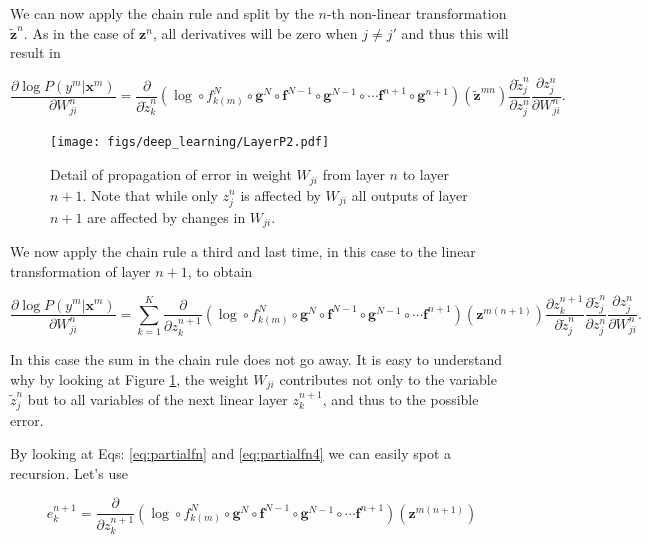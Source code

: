 We can now apply the chain rule and split by the $n$-th non-linear
transformation $\tilde{\mathbf{z}}^n$. As in the case of $\mathbf{z}^n$, all
derivatives will be zero when $j\neq j'$ and thus this will result in

\begin{equation}
\frac{\partial \log P(y^m | \mathbf{x}^m)}{\partial W_{ji}^n} = \frac{\partial}{\partial \tilde{z}^{n}_{k}} (\log \circ f_{k(m)}^N \circ \mathbf{g}^N \circ \mathbf{f}^{N-1} \circ \mathbf{g}^{N-1} \circ \cdots \mathbf{f}^{n+1} \circ \mathbf{g}^{n+1})(\tilde{\mathbf{z}}^{mn})\frac{\partial \tilde{z}^n_{j}}{\partial z_{j}^n}\frac{\partial z^n_{j}}{\partial W_{ji}^n} .
\label{eq:partialfn3}
\end{equation}


\begin{figure}
\centering
\texttt{[image: figs/deep\_learning/LayerP2.pdf]}
\caption{Detail of propagation of error in weight $W_{ji}$ from layer $n$ to
layer $n+1$. Note that while only $z_j^n$ is affected by $W_{ji}$ all outputs
of layer $n+1$ are affected by changes in $W_{ji}$.}
\label{fig:LayerP2}
\end{figure}

We now apply the chain rule a third and last time, in this case to the linear
transformation of layer $n+1$, to obtain

\begin{equation}
\frac{\partial \log P(y^m | \mathbf{x}^m)}{\partial W_{ji}^n} = \sum_{k=1}^K \frac{\partial}{\partial z^{n+1}_{k}} (\log \circ f_{k(m)}^N \circ \mathbf{g}^N \circ \mathbf{f}^{N-1} \circ \mathbf{g}^{N-1} \circ \cdots \mathbf{f}^{n+1})(\mathbf{z}^{m(n+1)})\frac{\partial z^{n+1}_k}{\partial \tilde{z}_{j}^n}\frac{\partial \tilde{z}^n_{j}}{\partial z_{j}^n}\frac{\partial z^n_{j}}{\partial W_{ji}^n} .
\label{eq:partialfn4}
\end{equation}

In this case the sum in the chain rule does not go away. It is easy to
understand why by looking at Figure \ref{fig:LayerP2}, the weight $W_{ji}$
contributes not only to the variable $\tilde{z}^n_j$ but to all variables of the
next linear layer $z^{n+1}_k$, and thus to the possible error. 

By looking at Eqs: \ref{eq:partialfn} and \ref{eq:partialfn4} we can easily
spot a recursion. Let's use

\begin{equation}
e^{n+1}_k = \frac{\partial}{\partial z^{n+1}_{k}} (\log \circ f_{k(m)}^N \circ \mathbf{g}^N \circ \mathbf{f}^{N-1} \circ \mathbf{g}^{N-1} \circ \cdots \mathbf{f}^{n+1})(\mathbf{z}^{m(n+1)})
\end{equation}

